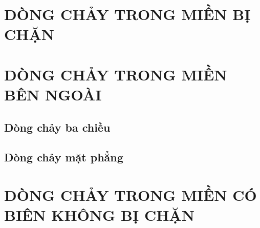 \documentclass{reportDoCS2025}
\begin{document}
\chapter{\MakeUppercase{Dòng chảy trong miền bị chặn}}





\chapter{\MakeUppercase{Dòng chảy trong miền bên ngoài}}


\section{Dòng chảy ba chiều}



\section{Dòng chảy mặt phẳng}



\chapter{\MakeUppercase{Dòng chảy trong miền có biên không bị chặn}}



\end{document}

